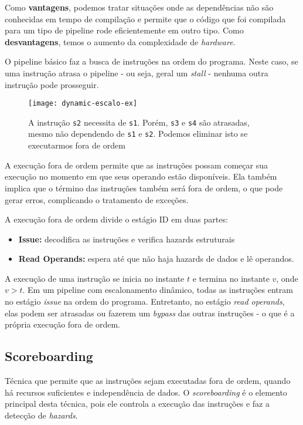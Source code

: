 Como \textbf{vantagens}, podemos tratar situações onde as dependências não são conhecidas em tempo de compilação e permite que o código que foi compilada para um tipo de pipeline rode eficientemente em outro tipo. Como \textbf{desvantagens}, temos o aumento da complexidade de \textit{hardware}.

O pipeline básico faz a busca de instruções na ordem do programa. Neste caso, se uma instrução atrasa o pipeline - ou seja, geral um \textit{stall} - nenhuma outra instrução pode prosseguir.

\begin{figure}[ht]
  \centering
  \texttt{[image: dynamic-escalo-ex]}
  \caption{A instrução \texttt{s2} necessita de \texttt{s1}. Porém, \texttt{s3} e \texttt{s4} são atrasadas, mesmo não dependendo de \texttt{s1} e \texttt{s2}. Podemos eliminar isto se executarmos fora de ordem}
  \label{fig:dynamic-escalo-ex}
\end{figure}

A execução fora de ordem permite que as instruções possam começar sua execução no momento em que seus operando estão disponíveis. Ela também implica que o término das instruções também será fora de ordem, o que pode gerar erros, complicando o tratamento de exceções.

A execução fora de ordem divide o estágio ID em duas partes:
\begin{itemize}
  \item \textbf{Issue:} decodifica as instruções e verifica hazards estruturais

  \item \textbf{Read Operands:} espera até que não haja hazards de dados e lê operandos.
\end{itemize}

A execução de uma instrução se inicia no instante $t$ e termina no instante $v$, onde $v > t$. Em um pipeline com escalonamento dinâmico, todas as instruções entram no estágio \textit{issue} na ordem do programa. Entretanto, no estágio \textit{read operands}, elas podem ser atrasadas ou fazerem um \textit{bypass} das outras instruções - o que é a própria execução fora de ordem.



\subsection{Scoreboarding}
Técnica que permite que as instruções sejam executadas fora de ordem, quando há recursos suficientes e independência de dados. O \textit{scoreboarding} é o elemento principal desta técnica, pois ele controla a execução das instruções e faz a detecção de \textit{hazards}.

